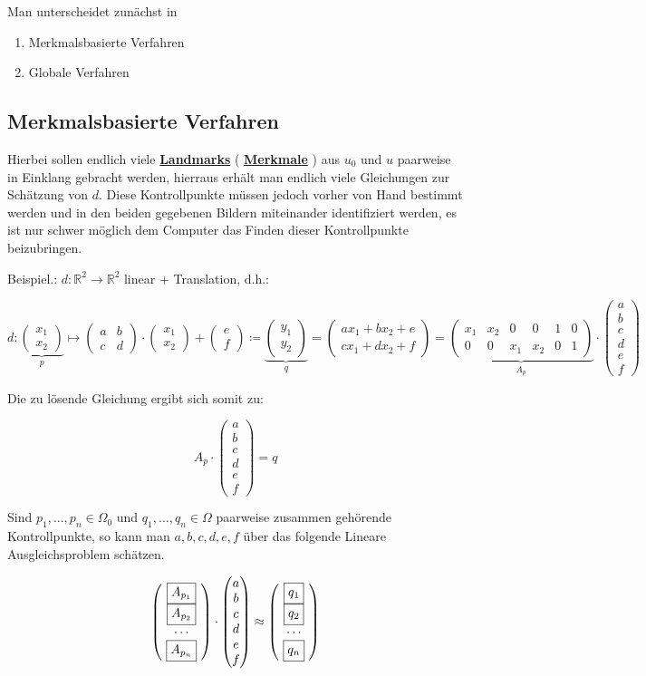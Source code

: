\documentclass{article}
\theoremstyle{plain}
\theoremstyle{definition}
\numberwithin{equation}{section}
\newcommand{\R}[0] {
\mathbb R
}
\newcommand{\mim}[1] {
\underline{\textbf{#1\index{#1}}}
}
\newcommand{\C}[0]{
    \cdot
}
\newcommand{\mat}[1] {
\begin{pmatrix} #1 \end{pmatrix}
}
\begin{document}
Man unterscheidet zunächst in

\begin{enumerate}
    \item[\textbullet] Merkmalsbasierte Verfahren
    \item[\textbullet] Globale Verfahren
\end{enumerate}

\subsection{Merkmalsbasierte Verfahren}

Hierbei sollen endlich viele \mim{Landmarks}(\mim{Merkmale}) aus $u_0$ und $u$ paarweise in Einklang gebracht werden, hierraus erhält man endlich viele Gleichungen zur Schätzung von $d$. Diese Kontrollpunkte müssen jedoch vorher von Hand bestimmt werden und in den beiden gegebenen Bildern miteinander identifiziert werden, es ist nur schwer möglich dem Computer das Finden dieser Kontrollpunkte beizubringen.

Beispiel.: $d:\R^2 \to \R^2$ linear + Translation, d.h.:

\[ d:\underbrace{\mat{x_1 \\ x_2}}_{p} \mapsto \mat{a & b \\ c & d} \C \mat{x_1 \\ x_2}+ \mat{e\\f} \coloneqq \underbrace{\mat{y_1 \\ y_2}}_{q} = \mat{ax_1 + bx_2 +e\\ cx_1 + dx_2 + f} = \underbrace{\mat{x_1 & x_2 & 0 & 0 & 1 & 0\\ 0 & 0 & x_1 & x_2 & 0 & 1}}_{A_p}\C \mat{a\\b\\c\\d\\e\\f}\]

Die zu lösende Gleichung ergibt sich somit zu:

\[A_p \C \mat{a\\b\\c\\d\\e\\f} = q\]

Sind $p_1,...,p_n \in \Omega_0$ und $q_1,...,q_n \in \Omega$ paarweise zusammen gehörende Kontrollpunkte, so kann man $a,b,c,d,e,f$ über das folgende Lineare Ausgleichsproblem schätzen.

\[ \mat{\ \boxed{A_{p_1}} \ \\ \ \boxed{A_{p_2}} \ \\ \cdots \\ \ \boxed{A_{p_n}} \ } \C \mat{a\\b\\c\\d\\e\\f} \approx \mat{\ \boxed{q_1 \vphantom{A_{p_1}}} \ \\ \ \boxed{q_2 \vphantom{A_{p_1}}} \ \\ \cdots \\ \ \boxed{q_n \vphantom{A_{p_1}}} \ }\]
\end{document}
